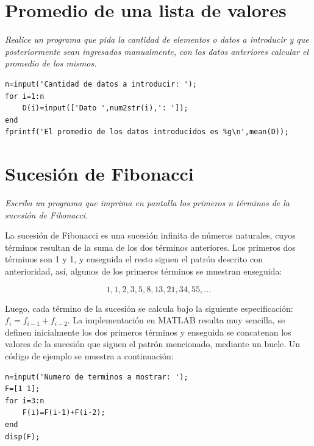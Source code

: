\section{Promedio de una lista de valores}

\textit{Realice un programa que pida la cantidad de elementos o datos a introducir y que posteriormente sean ingresados manualmente, con los datos anteriores calcular el promedio de los mismos.}

\sol

\begin{verbatim}
n=input('Cantidad de datos a introducir: ');
for i=1:n
    D(i)=input(['Dato ',num2str(i),': ']);
end
fprintf('El promedio de los datos introducidos es %g\n',mean(D));
\end{verbatim}


\section{Sucesión de Fibonacci}

\textit{Escriba un programa que imprima en pantalla los primeros n términos de la sucesión de Fibonacci.}

\sol

La sucesión de Fibonacci es una sucesión infinita de números naturales, cuyos términos resultan de la 
suma de los dos términos anteriores. Los primeros dos términos son 1 y 1, y enseguida el resto siguen 
el patrón descrito con anterioridad, así, algunos de los primeros términos se muestran enseguida:

$$ 1,1,2,3,5,8,13,21,34,55,... $$

Luego, cada término de la sucesión se calcula bajo la siguiente especificación: $f_i=f_{i-1}+f_{i-2}$. 
La implementación en MATLAB resulta muy sencilla, se definen inicialmente los dos primeros términos y 
enseguida se concatenan los valores de la sucesión que siguen el patrón mencionado, mediante un bucle. 
Un código de ejemplo se muestra a continuación:

\begin{verbatim}
n=input('Numero de terminos a mostrar: ');
F=[1 1];
for i=3:n
    F(i)=F(i-1)+F(i-2);
end
disp(F);
\end{verbatim}


